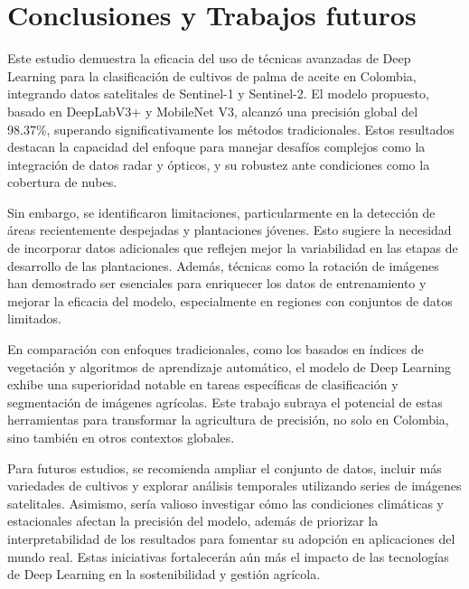 \section{Conclusiones y Trabajos futuros}
Este estudio demuestra la eficacia del uso de técnicas avanzadas de Deep Learning para la clasificación de cultivos de palma de aceite en Colombia, integrando datos satelitales de Sentinel-1 y Sentinel-2. El modelo propuesto, basado en DeepLabV3+ y MobileNet V3, alcanzó una precisión global del 98.37\%, superando significativamente los métodos tradicionales. Estos resultados destacan la capacidad del enfoque para manejar desafíos complejos como la integración de datos radar y ópticos, y su robustez ante condiciones como la cobertura de nubes.

Sin embargo, se identificaron limitaciones, particularmente en la detección de áreas recientemente despejadas y plantaciones jóvenes. Esto sugiere la necesidad de incorporar datos adicionales que reflejen mejor la variabilidad en las etapas de desarrollo de las plantaciones. Además, técnicas como la rotación de imágenes han demostrado ser esenciales para enriquecer los datos de entrenamiento y mejorar la eficacia del modelo, especialmente en regiones con conjuntos de datos limitados.

En comparación con enfoques tradicionales, como los basados en índices de vegetación y algoritmos de aprendizaje automático, el modelo de Deep Learning exhibe una superioridad notable en tareas específicas de clasificación y segmentación de imágenes agrícolas. Este trabajo subraya el potencial de estas herramientas para transformar la agricultura de precisión, no solo en Colombia, sino también en otros contextos globales.

Para futuros estudios, se recomienda ampliar el conjunto de datos, incluir más variedades de cultivos y explorar análisis temporales utilizando series de imágenes satelitales. Asimismo, sería valioso investigar cómo las condiciones climáticas y estacionales afectan la precisión del modelo, además de priorizar la interpretabilidad de los resultados para fomentar su adopción en aplicaciones del mundo real. Estas iniciativas fortalecerán aún más el impacto de las tecnologías de Deep Learning en la sostenibilidad y gestión agrícola.
